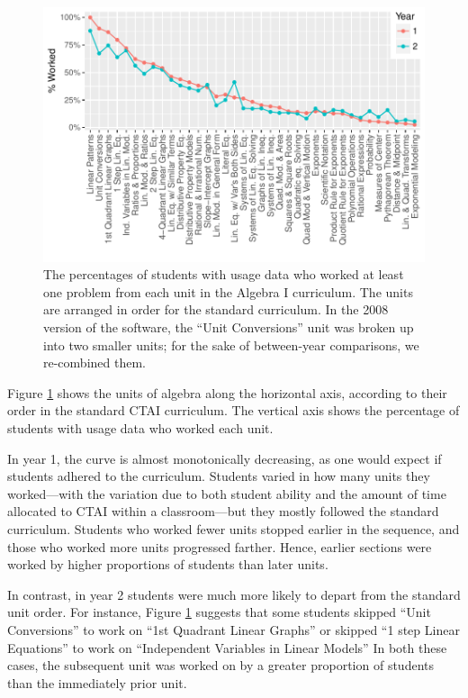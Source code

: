 \documentclass[12pt]{article}\usepackage[]{graphicx}\usepackage[]{color}
\makeatletter
\def\maxwidth{ %
  \ifdim\Gin@nat@width>\linewidth
    \linewidth
  \else
    \Gin@nat@width
  \fi
}
\makeatother
\begin{document}
\begin{figure}
  \centering

\includegraphics[width=\maxwidth]{figure/whichUnits-1} 

\caption{The percentages of students with usage data who worked at
  least one problem from each unit in the Algebra I curriculum. The
  units are arranged in order for the standard curriculum. In the 2008
version of the software, the ``Unit Conversions'' unit was broken up
into two smaller units; for the sake of between-year comparisons, we
re-combined them.}
\label{fig:unitsWorked}
\end{figure}


Figure \ref{fig:unitsWorked} shows the units of algebra along the
horizontal axis, according to their order in the standard CTAI
curriculum.
The vertical axis shows the percentage of students with usage data who
worked each unit.

In year 1, the curve is almost monotonically decreasing, as one would
expect if students adhered to the curriculum.
Students varied in how many units they worked---with the variation due
to both student ability and the amount of time allocated to CTAI
within a classroom---but they mostly followed the standard curriculum.
Students who worked fewer units stopped earlier in the sequence, and those who worked more units progressed farther.
Hence, earlier sections were worked by higher proportions of students
than later units.

In contrast, in year 2 students were much more likely to depart from the
standard unit order.
For instance, Figure \ref{fig:unitsWorked} suggests that some students
skipped ``Unit Conversions'' to work on  ``1st
Quadrant Linear Graphs'' or skipped ``1 step Linear Equations'' to work on ``Independent Variables in Linear Models''
In both these cases, the subsequent unit was worked on by a greater
proportion of students than the immediately prior unit.
\end{document}
